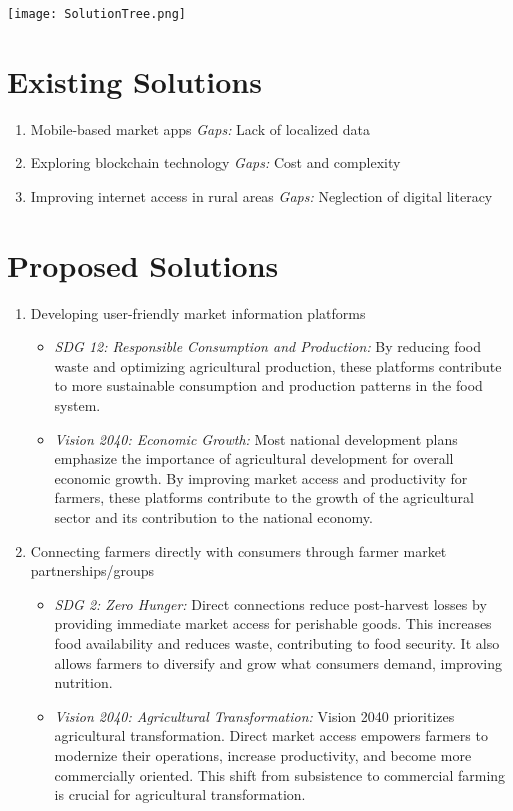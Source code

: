 \documentclass[12pt, a4paper]{article}
\begin{document}
\begin{center}
    \texttt{[image: SolutionTree.png]}
\end{center}

\section*{Existing Solutions}

\begin{enumerate}
    \item Mobile-based market apps
    \textit{Gaps:} Lack of localized data
    \item Exploring blockchain technology
    \textit{Gaps:} Cost and complexity
    \item Improving internet access in rural areas
    \textit{Gaps:} Neglection of digital literacy
\end{enumerate}

\section*{Proposed Solutions}

\begin{enumerate}
    \item Developing user-friendly market information platforms
    \begin{itemize}
        \item \textit{SDG 12: Responsible Consumption and Production:} By reducing food waste and optimizing agricultural production, these platforms contribute to more sustainable consumption and production patterns in the food system.
        \item \textit{Vision 2040: Economic Growth:} Most national development plans emphasize the importance of agricultural development for overall economic growth. By improving market access and productivity for farmers, these platforms contribute to the growth of the agricultural sector and its contribution to the national economy.
    \end{itemize}
    \item Connecting farmers directly with consumers through farmer market partnerships/groups
    \begin{itemize}
        \item \textit{SDG 2: Zero Hunger:} Direct connections reduce post-harvest losses by providing immediate market access for perishable goods. This increases food availability and reduces waste, contributing to food security. It also allows farmers to diversify and grow what consumers demand, improving nutrition.
        \item \textit{Vision 2040: Agricultural Transformation:} Vision 2040 prioritizes agricultural transformation. Direct market access empowers farmers to modernize their operations, increase productivity, and become more commercially oriented. This shift from subsistence to commercial farming is crucial for agricultural transformation.
    \end{itemize}
\end{enumerate}

\citep{Obaideen2022}
\citep{Guggisberg2022}

 
 
\end{document}
